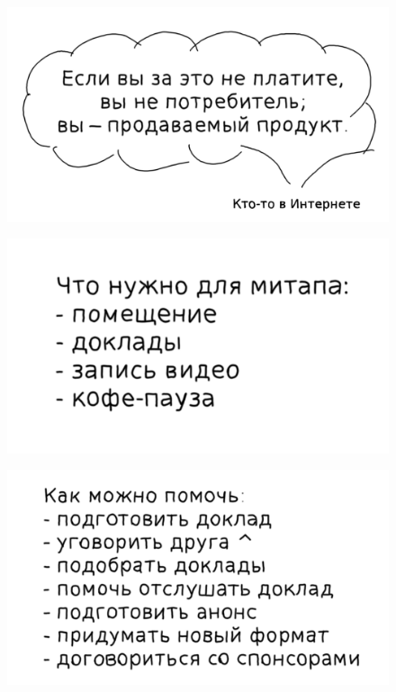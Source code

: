 \documentclass[10pt,pdf,utf8,aspectratio=169,xcolor=dvipsnames,x11names,center]{beamer}
\begin{document}
\begin{frame}
  \begin{figure}
    \includegraphics[scale=0.88]{Slides-03-quote}
  \end{figure}
\end{frame}

\begin{frame}
  \begin{figure}
    \includegraphics[scale=0.88]{Slides-04-needed}
  \end{figure}
\end{frame}

\begin{frame}
  \begin{figure}
    \includegraphics[scale=0.88]{Slides-05-help}
  \end{figure}
\end{frame}
\end{document}
